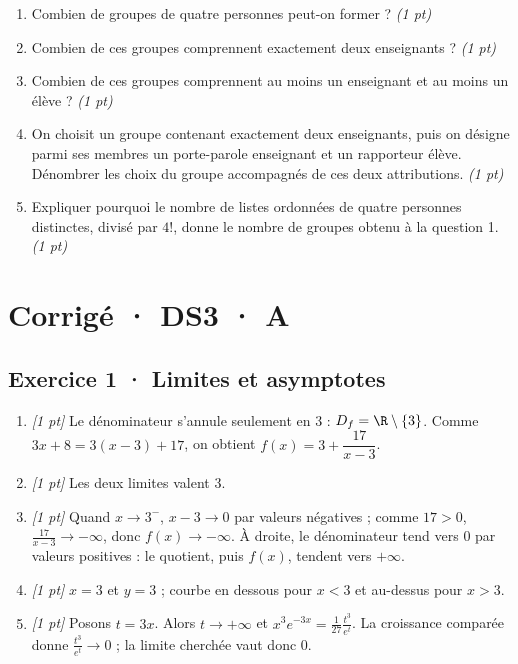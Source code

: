 \begin{enumerate}

\item Combien de groupes de quatre personnes peut-on former ? \hfill\textit{(1 pt)}

\item Combien de ces groupes comprennent exactement deux enseignants ? \hfill\textit{(1 pt)}

\item Combien de ces groupes comprennent au moins un enseignant et au moins un élève ? \hfill\textit{(1 pt)}

\item On choisit un groupe contenant exactement deux enseignants, puis on désigne parmi ses membres un porte-parole enseignant et un rapporteur élève. Dénombrer les choix du groupe accompagnés de ces deux attributions. \hfill\textit{(1 pt)}

\item Expliquer pourquoi le nombre de listes ordonnées de quatre personnes distinctes, divisé par $4!$, donne le nombre de groupes obtenu à la question 1. \hfill\textit{(1 pt)}

\end{enumerate}

\ifprof\clearpage

\section*{Corrigé · DS3 · A}\label{cor:4-3}

\subsection*{Exercice 1 · Limites et asymptotes}\begin{enumerate}

\item \textit{[1 pt]} Le dénominateur s'annule seulement en $3$ : $D_f=\R\setminus\{3\}$. Comme $3x+8=3(x-3)+17$, on obtient $f(x)=3+\dfrac{17}{x-3}$.

\item \textit{[1 pt]} Les deux limites valent $3$.

\item \textit{[1 pt]} Quand $x\to 3^-$, $x-3\to0$ par valeurs négatives ; comme $17>0$, $\frac{17}{x-3}\to-\infty$, donc $f(x)\to-\infty$. À droite, le dénominateur tend vers $0$ par valeurs positives : le quotient, puis $f(x)$, tendent vers $+\infty$.

\item \textit{[1 pt]} $x=3$ et $y=3$ ; courbe en dessous pour $x<3$ et au-dessus pour $x>3$.

\item \textit{[1 pt]} Posons $t=3x$. Alors $t\to+\infty$ et $x^3e^{-3x}=\frac{1}{27}\frac{t^3}{e^t}$. La croissance comparée donne $\frac{t^3}{e^t}\to0$ ; la limite cherchée vaut donc $0$.

\end{enumerate}

